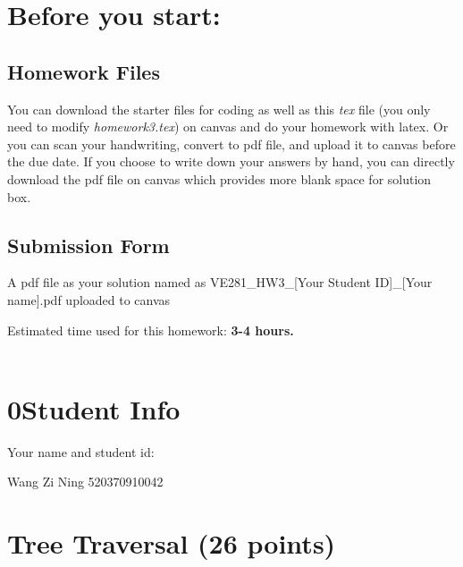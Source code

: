 \documentclass[11pt]{exam}
\begin{document}
\setlength{\parindent}{0pt}
\section*{Before you start:}

\subsection*{Homework Files}
You can download the starter files for coding as well as this \textit{tex} file (you only need to modify \textit{homework3.tex}) on canvas and do your homework with latex. Or you can scan your handwriting, convert to pdf file, and upload it to canvas before the due date. If you choose to write down your answers by hand, you can directly download the pdf file on canvas which provides more blank space for solution box.\\

\subsection*{Submission Form}
A pdf file as your solution named as VE281\_HW3\_[Your Student ID]\_[Your name].pdf uploaded to canvas


Estimated time used for this homework: \textbf{3-4 hours.}
\\\\


\newpage
\section*{0\quad Student Info}
Your name and student id:
\begin{solution}
    Wang Zi Ning 520370910042
\end{solution}

\section{Tree Traversal (26 points)}
\end{document}
